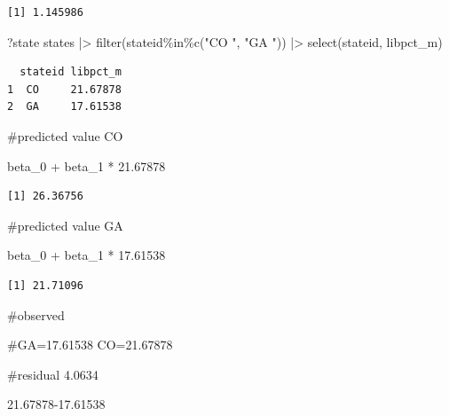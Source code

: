 \documentclass[
  letterpaper,
  DIV=11,
  numbers=noendperiod]{scrartcl}
\newenvironment{Shaded}{\begin{snugshade}}{\end{snugshade}}
\newcommand{\CommentTok}[1]{\textcolor[rgb]{0.37,0.37,0.37}{#1}}
\newcommand{\FloatTok}[1]{\textcolor[rgb]{0.68,0.00,0.00}{#1}}
\newcommand{\FunctionTok}[1]{\textcolor[rgb]{0.28,0.35,0.67}{#1}}
\newcommand{\NormalTok}[1]{\textcolor[rgb]{0.00,0.23,0.31}{#1}}
\newcommand{\SpecialCharTok}[1]{\textcolor[rgb]{0.37,0.37,0.37}{#1}}
\newcommand{\StringTok}[1]{\textcolor[rgb]{0.13,0.47,0.30}{#1}}
\begin{document}
\begin{verbatim}
[1] 1.145986
\end{verbatim}

\begin{Shaded}
\begin{Highlighting}[]
\NormalTok{?state}
\NormalTok{states }\SpecialCharTok{|\textgreater{}}
  \FunctionTok{filter}\NormalTok{(stateid}\SpecialCharTok{\%in\%}\FunctionTok{c}\NormalTok{(}\StringTok{"CO    "}\NormalTok{, }\StringTok{"GA    "}\NormalTok{)) }\SpecialCharTok{|\textgreater{}}
  \FunctionTok{select}\NormalTok{(stateid, libpct\_m)}
\end{Highlighting}
\end{Shaded}

\begin{verbatim}
  stateid libpct_m
1  CO     21.67878
2  GA     17.61538
\end{verbatim}

\begin{Shaded}
\begin{Highlighting}[]
\CommentTok{\#predicted value CO}

\NormalTok{beta\_0 }\SpecialCharTok{+}\NormalTok{ beta\_1 }\SpecialCharTok{*} \FloatTok{21.67878}
\end{Highlighting}
\end{Shaded}

\begin{verbatim}
[1] 26.36756
\end{verbatim}

\begin{Shaded}
\begin{Highlighting}[]
\CommentTok{\#predicted value GA}

\NormalTok{beta\_0 }\SpecialCharTok{+}\NormalTok{ beta\_1 }\SpecialCharTok{*} \FloatTok{17.61538}
\end{Highlighting}
\end{Shaded}

\begin{verbatim}
[1] 21.71096
\end{verbatim}

\begin{Shaded}
\begin{Highlighting}[]
\CommentTok{\#observed }

\CommentTok{\#GA=17.61538 CO=21.67878}

\CommentTok{\#residual 4.0634}

 \FloatTok{21.67878{-}17.61538}
\end{Highlighting}
\end{Shaded}
\end{document}
